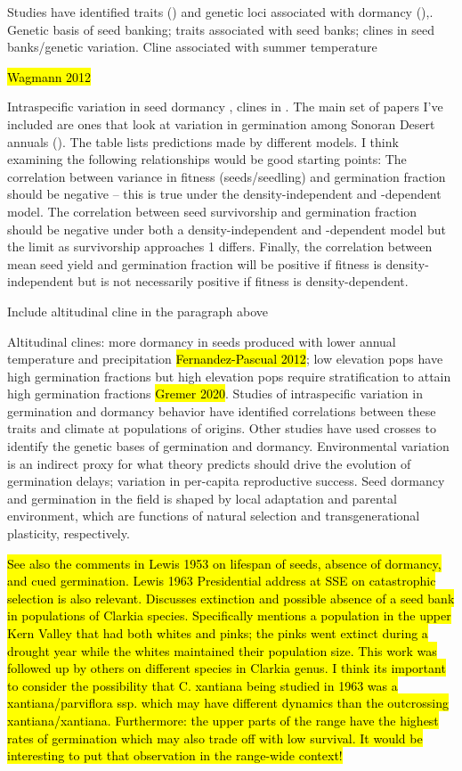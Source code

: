 \documentclass[12pt, oneside, titlepage]{article}   	%
\begin{document}
Studies have identified traits () and genetic loci associated with dormancy (),.  
Genetic basis of seed banking; traits associated with seed banks; clines in seed banks/genetic variation.
Cline associated with summer temperature {\hl{Wagmann 2012}

Intraspecific variation in seed dormancy , clines in 
. The main set of papers I've included are ones that look at variation in germination among Sonoran Desert annuals (\cite{venable2007,gremer2014,gremer2016}). The table lists predictions made by different models. I think examining the following relationships would be good starting points: The correlation between variance in fitness (seeds/seedling) and germination fraction should be negative -- this is true under the density-independent and -dependent model. The correlation between seed survivorship and germination fraction should be negative under both a density-independent and -dependent model but the limit as survivorship approaches 1 differs. Finally, the correlation between mean seed yield and germination fraction will be positive if fitness is density-independent but is not necessarily positive if fitness is density-dependent.

Include altitudinal cline in the paragraph above

Altitudinal clines: more dormancy in seeds produced with lower annual temperature and precipitation \hl{Fernandez-Pascual 2012}; low elevation pops have high germination fractions but high elevation pops require stratification to attain high germination fractions \hl{Gremer 2020}. Studies of intraspecific variation in germination and dormancy behavior have identified correlations between these traits and climate at populations of origins. Other studies have used crosses to identify the genetic bases of germination and dormancy. Environmental variation is an indirect proxy for what theory predicts should drive the evolution of germination delays; variation in per-capita reproductive success. Seed dormancy and germination in the field is shaped by local adaptation and parental environment, which are functions of natural selection and transgenerational plasticity, respectively. 


\hl{See also the comments in Lewis 1953 on lifespan of seeds, absence of dormancy, and cued germination. Lewis 1963 Presidential address at SSE on catastrophic selection is also relevant. Discusses extinction and possible absence of a seed bank in populations of Clarkia species. Specifically mentions a population in the upper Kern Valley that had both whites and pinks; the pinks went extinct during a drought year while the whites maintained their population size. This work was followed up by others on different species in Clarkia genus. I think its important to consider the possibility that C. xantiana being studied in 1963 was a xantiana/parviflora ssp. which may have different dynamics than the outcrossing xantiana/xantiana. Furthermore: the upper parts of the range have the highest rates of germination which may also trade off with low survival. It would be interesting to put that observation in the range-wide context!} 

}
\end{document}
